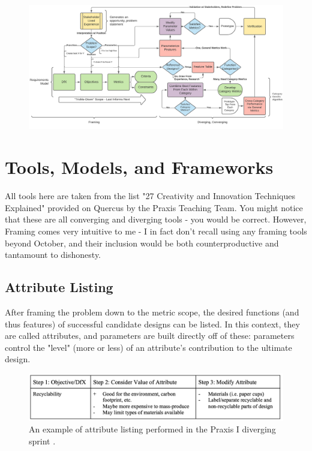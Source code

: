 \documentclass{report}
\begin{document}
\begin{figure}[h]
    \centering
    \includegraphics[width=\textwidth]{images/process.png}
    \hfill
\end{figure}

\pagebreak
\section{Tools, Models, and Frameworks}

All tools here are taken from the list "27 Creativity and Innovation Techniques Explained" provided on Quercus by the Praxis Teaching Team. You might notice that these are all converging and diverging tools - you would be correct. However, Framing comes very intuitive to me - I in fact don't recall using any framing tools beyond October, and their inclusion would be both counterproductive and tantamount to dishonesty.

\subsection{Attribute Listing}

After framing the problem down to the metric scope, the desired functions (and thus features)
of successful candidate designs can be listed. In this context, they are called attributes, and
parameters are built directly off of these: parameters control the "level" (more or less) of an attribute's
contribution to the ultimate design.

\begin{figure}[h]
    \centering
    \includegraphics[width=\textwidth/2]{images/attributelisting.png}
    \hfill
    \caption{An example of attribute listing performed in the Praxis I diverging sprint \cite{candidatestools}.}
\end{figure}
\end{document}
